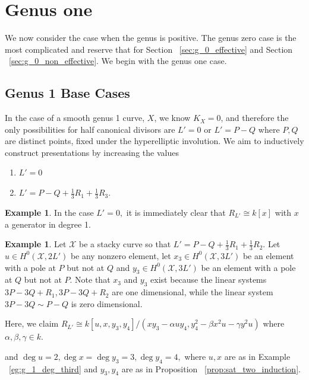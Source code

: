 \documentclass{amsart}
\theoremstyle{plain}
\theoremstyle{definition}
\newtheorem{example}[thm]{Example}
\theoremstyle{remark}
\numberwithin{equation}{section}
\newcommand\ssec{\subsection}
\newcommand \sx{\mathscr X}
\newcommand \halfcan{L}
\begin{document}
\section{Genus one}
We now consider the case when the genus is positive. The genus zero
case is the most complicated and reserve that for Section ~\ref{sec:g_0_effective}
and Section ~\ref{sec:g_0_non_effective}. We begin with the genus one case.


\ssec{Genus 1 Base Cases}

In the case of a smooth genus 1 curve, $X$, we know $K_X = 0$, and therefore the only possibilities for half canonical divisors are $\halfcan' = 0$ or $\halfcan' = P-Q$ where $P,Q$ are distinct points, fixed under the hyperelliptic involution. We aim to inductively construct presentations by increasing the values 

\begin{enumerate}
	\item $\halfcan' = 0$
	\item $\halfcan' = P - Q + \frac{1}{3}R_1 + \frac{1}{3}R_3.$
\end{enumerate}

\begin{example}
\label{eg:g_1_triv}
In the case $\halfcan' = 0,$ it is immediately clear that $R_{\halfcan'} \cong k[x]$ with $x$ a generator in degree 1.
\end{example}

\begin{example}
Let $\sx$ be a stacky curve so that $\halfcan' = P - Q + \frac{1}{3}R_1 + \frac{1}{3}R_2$. Let $u \in H^0(\sx,2\halfcan')$ be any nonzero element, let $x_3 \in H^0(\sx,3\halfcan')$ be an element with a pole at $P$ but not at $Q$ and $y_3 \in H^0(\sx,3\halfcan')$ be an element with a pole at $Q$ but not at $P$. Note that $x_3$ and $y_3$ exist because the linear systems $3P - 3Q + R_1, 3P - 3Q + R_2$ are one dimensional, while the linear system $3P - 3Q \sim P-Q$ is zero dimensional.

Here, we claim $R_{\halfcan'} \cong k[u,x,y_3,y_4]/(xy_3- \alpha uy_4,y_4^2 - \beta x^2 u - \gamma y^2u)$ where $\alpha,\beta,\gamma \in k.$

 and $\deg u = 2, \deg x = \deg y_3 = 3, \deg y_4 = 4,$ where $u,x$ are as in Example ~\ref{eg:g_1_deg_third} and $y_3, y_4$ are as in Proposition ~\ref{prop:sat_two_induction}.

\end{example}
\end{document}
